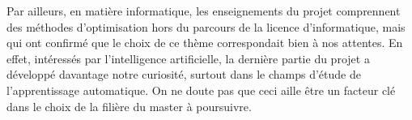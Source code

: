 \documentclass[12pt,a4paper]{article}
\begin{document}
Par ailleurs, en mati\`ere informatique, les enseignements du projet 
comprennent des m\'ethodes d'optimisation hors du parcours de la licence 
d'informatique, mais qui ont confirm\'e que le choix de ce th\`eme 
correspondait bien \`a nos attentes. En effet, int\'eress\'es par 
l'intelligence artificielle, la derni\`ere partie du projet a d\'evelopp\'e 
davantage notre curiosit\'e, surtout dans le champs d'\'etude de l'apprentissage 
automatique. On ne doute pas que ceci aille \^etre un facteur cl\'e dans le 
choix de la fili\`ere du master \`a poursuivre.

\end{document}
